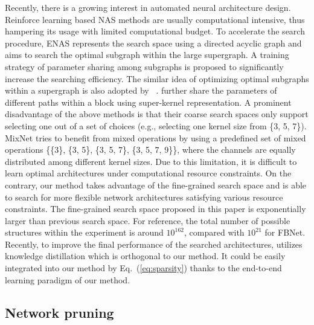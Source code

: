 \documentclass{article} \usepackage{iclr2020_conference,times}
\begin{document}
Recently, there is a growing interest in automated neural architecture design. Reinforce learning based NAS methods \citep{zoph2017nasnet,tan2019mnasnet,tan2019mixnet,mingxing2019efficient} are usually computational intensive, thus hampering its usage with limited computational budget. To accelerate the search procedure, ENAS \citep{hieu2018enas} represents the search space using a directed acyclic graph and aims to search the optimal subgraph within the large supergraph. A training strategy of parameter sharing among subgraphs is proposed to significantly increase the searching efficiency. The similar idea of optimizing optimal subgraphs within a supergraph is also adopted by ~\cite{hanxiao2019darts,jin2019rc_darts,xu2020pc_darts,wu2019fbnet,zichao2019uniform_sampling,han2019proxyless}. \cite{stamoulis2019single_path,yu2020bignas} further share the parameters of different paths within a block using super-kernel representation.
A prominent disadvantage of the above methods is that their coarse search spaces only support selecting one out of a set of choices (e.g., selecting one kernel size from \{3, 5, 7\}). MixNet tries to benefit from mixed operations by using a predefined set of mixed operations \{\{3\}, \{3, 5\}, \{3, 5, 7\}, \{3, 5, 7, 9\}\}, where the channels are equally distributed among different kernel sizes. Due to this limitation, it is difficult to learn optimal architectures under computational resource constraints. On the contrary, our method takes advantage of the fine-grained search space and is able to search for more flexible network architectures satisfying various resource constraints. The fine-grained search space proposed in this paper is exponentially larger than previous search space. For reference, the total number of possible structures within the experiment is around $10^{162}$, compared with $10^{21}$ for FBNet.
Recently, to improve the final performance of the searched architectures, \cite{yu2020bignas} utilizes knowledge distillation which is orthogonal to our method. It could be easily integrated into our method by Eq.~(\ref{eq:sparsity}) thanks to the end-to-end learning paradigm of our method.

\subsection{Network pruning}
\end{document}
